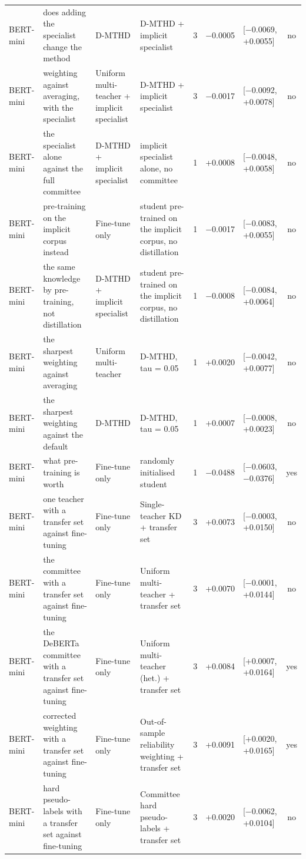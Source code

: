 {\begin{longtable}{p{1.5cm}p{2.9cm}p{2.5cm}p{2.6cm}cp{1.0cm}p{1.8cm}c}
BERT-mini & does adding the specialist change the method & D-MTHD & D-MTHD + implicit specialist & 3 & $-$0.0005 & [$-$0.0069, +0.0055] & no \\
BERT-mini & weighting against averaging, with the specialist & Uniform multi-teacher + implicit specialist & D-MTHD + implicit specialist & 3 & $-$0.0017 & [$-$0.0092, +0.0078] & no \\
BERT-mini & the specialist alone against the full committee & D-MTHD + implicit specialist & implicit specialist alone, no committee & 1 & +0.0008 & [$-$0.0048, +0.0058] & no \\
BERT-mini & pre-training on the implicit corpus instead & Fine-tune only & student pre-trained on the implicit corpus, no distillation & 1 & $-$0.0017 & [$-$0.0083, +0.0055] & no \\
BERT-mini & the same knowledge by pre-training, not distillation & D-MTHD + implicit specialist & student pre-trained on the implicit corpus, no distillation & 1 & $-$0.0008 & [$-$0.0084, +0.0064] & no \\
BERT-mini & the sharpest weighting against averaging & Uniform multi-teacher & D-MTHD, tau = 0.05 & 1 & +0.0020 & [$-$0.0042, +0.0077] & no \\
BERT-mini & the sharpest weighting against the default & D-MTHD & D-MTHD, tau = 0.05 & 1 & +0.0007 & [$-$0.0008, +0.0023] & no \\
BERT-mini & what pre-training is worth & Fine-tune only & randomly initialised student & 1 & $-$0.0488 & [$-$0.0603, $-$0.0376] & yes \\
BERT-mini & one teacher with a transfer set against fine-tuning & Fine-tune only & Single-teacher KD + transfer set & 3 & +0.0073 & [$-$0.0003, +0.0150] & no \\
BERT-mini & the committee with a transfer set against fine-tuning & Fine-tune only & Uniform multi-teacher + transfer set & 3 & +0.0070 & [$-$0.0001, +0.0144] & no \\
BERT-mini & the DeBERTa committee with a transfer set against fine-tuning & Fine-tune only & Uniform multi-teacher (het.) + transfer set & 3 & +0.0084 & [+0.0007, +0.0164] & yes \\
BERT-mini & corrected weighting with a transfer set against fine-tuning & Fine-tune only & Out-of-sample reliability weighting + transfer set & 3 & +0.0091 & [+0.0020, +0.0165] & yes \\
BERT-mini & hard pseudo-labels with a transfer set against fine-tuning & Fine-tune only & Committee hard pseudo-labels + transfer set & 3 & +0.0020 & [$-$0.0062, +0.0104] & no \\

\end{longtable}}
